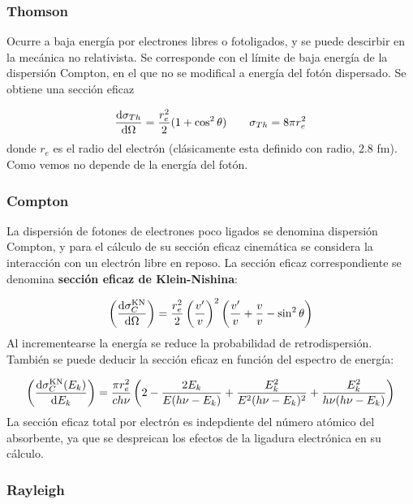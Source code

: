 \subsubsection{Thomson}

Ocurre a baja energía por electrones libres o fotoligados, y se puede descirbir en la mecánica no relativista. Se corresponde con el límite de baja energía de la dispersión Compton, en el que no se modifical a energía del fotón dispersado. Se obtiene una sección eficaz 

\begin{equation}
\dv{\sigma_{Th}}{\Omega} = \frac{r_e^2}{2} (1+\cos^2 \theta) \qquad \sigma_{Th} = 8 \pi r_e^2
\end{equation}
donde $r_e$ es el radio del electrón (clásicamente esta definido con radio, 2.8 fm). Como vemos no depende de la energía del fotón. 

\subsubsection{Compton}

La dispersión de fotones de electrones poco ligados se denomina dispersión Compton, y para el cálculo de su sección eficaz cinemática se considera la interacción con un electrón libre en reposo. La sección eficaz correspondiente se denomina \textbf{sección eficaz de Klein-Nishina}: 

\begin{equation}
\left( \dv{\sigma_C^{\text{KN}}}{\Omega} \right) = \frac{r_e^2}{2} \left( \frac{v'}{v} \right)^2 
\left( \frac{v'}{v} + \frac{v}{v} - \sin^2\theta \right)
\end{equation}
Al incrementearse la energía se reduce la probabilidad de retrodispersión. También se puede deducir la sección eficaz en función del espectro de energía: 

\begin{equation}
\left( \dv{\sigma_C^{\text{KN}}(E_k)}{E_k} \right) = \frac{\pi r_e^2}{c h \nu} \left(  2 - \frac{2E_k}{E(h\nu - E_k)} + \frac{E_k^2}{E^2 (h\nu - E_k)^2} + \frac{E_k^2}{h\nu (h\nu - E_k)}
\right)
\end{equation}
La sección eficaz total por electrón es indepdiente del número atómico del absorbente, ya que se despreican los efectos de la ligadura electrónica en su cálculo. 

\subsubsection{Rayleigh}

